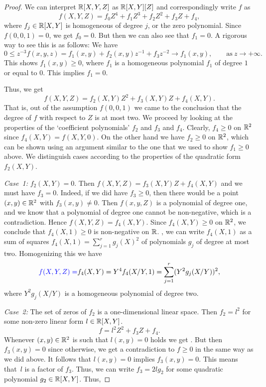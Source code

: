 \begin{proof}
	We can interpret $\mathbb{R}[X,Y,Z]$ as $\mathbb{R}[X,Y][Z]$ and correspondingly write $f$ as 
	\[
	f(X,Y,Z) = f_0 Z^4 + f_1 Z^3 + f_2 Z^2 + f_3 Z + f_4,
	\] 
	where $f_j \in \mathbb{R}[X,Y]$ is homogeneous of degree $j$, or the zero polynomial. Since $f(0,0,1)=0$, we get $f_0=0$. But then we can also see that $f_1 = 0$. A rigorous way to see this is as follows: We have 
	\[
		0 \le z^{-3} f(x,y,z) = f_1(x,y)  + f_2(x,y) z^{-1} + f_3 z^{-2} \to f_1(x,y), \qquad \text{as} \ z \to +\infty.
	\]
	This shows $f_1(x,y) \ge 0$, where $f_1$ is a homogeneous polynomial $f_1$ of degree $1$ or equal to $0$. This implies $f_1=0$. 

	Thus, we get
	\[
		f(X,Y,Z) = f_2(X,Y) Z^2 + f_3(X,Y) Z + f_4(X,Y).
	\]
	That is, out of the assumption $f(0,0,1)$ we came to the conclusion that the degree of $f$ with respect to $Z$ is at most two. We proceed by looking at the properties of the `coefficient polynomials' $f_2$ and $f_3$ and $f_4$. Clearly, $f_4 \ge 0$ on $\mathbb{R}^2$ since $f_4(X,Y)= f(X,Y,0)$. On the other hand we have $f_2 \ge 0$ on $\mathbb{R}^2$, which can be shown using an argument similar to the one that we used to show $f_1 \ge 0$ above. We distinguish cases according to the properties of the quadratic form $f_2(X,Y)$.
	
\smallskip
	\emph{Case~1:}	$f_2(X,Y)=0$. Then $f(X,Y,Z) = f_3(X,Y) Z + f_4(X,Y)$ and we must have $f_3 = 0$. Indeed, if we did have $f_3 \ge 0$, then there would be a point $(x,y) \in \mathbb{R}^2$ with $f_3(x,y) \ne 0$. Then $f(x,y,Z)$ is a polynomial of degree one, and we know that a polynomial of degree one cannot be non-negative, which is a contradiction. Hence $f(X,Y,Z) = f_4(X,Y)$. Since $f_4(X,Y) \ge 0$ on $\mathbb{R}^2$, we conclude that $f_4(X,1) \ge 0$ is non-negative on $\mathbb{R}$. , we can write $f_4(X,1)$ as a sum of squares $f_4(X,1) = \sum_{j=1}^r g_j(X)^2$ of polynomials $g_j$ of degree at most two.  Homogenizing this we have 
	\[
		\textcolor{blue}{f(X,Y,Z) = }f_4(X,Y) = Y^4 f_4(X/Y,1) = \sum_{j=1}^r (Y^2 g_j(X/Y))^2,
	\]
	where $Y^2 g_j(X/Y)$ is a homogeneous polynomial of degree two. 	

\smallskip
	\emph{Case~2:} The set of zeros of $f_2$ is a one-dimensional linear space. Then $f_2 = l^2$ for some non-zero linear form $l \in \mathbb{R}[X,Y]$. 	
	\[
		f = l^2 Z^2 + f_3 Z + f_4 .
	\]
	Whenever $(x,y) \in \mathbb{R}^2$ is such that $l(x,y)=0$ holds we get . But then $f_3(x,y)=0$ since otherwise, we get a contradiction to $f \ge 0$ in the same way as we did above. It follows that $l(x,y)=0$ implies $f_3(x,y)=0$. This means that~$l$ is a factor of $f_3$. Thus, we can write  $f_3 = 2 l g_2$ for some quadratic polynomial $g_2 \in \mathbb{R}[X,Y]$. Thus, 
	

\end{proof}

